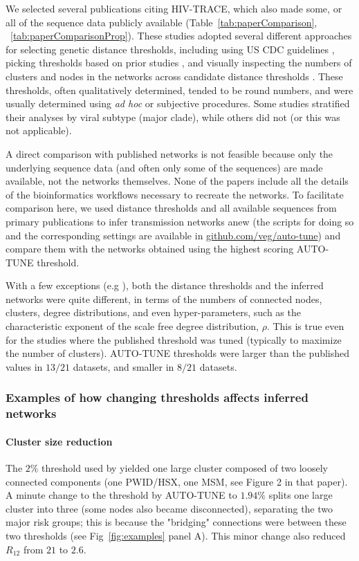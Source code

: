 \documentclass[utf8]{FrontiersinHarvard} %
\begin{document}
We selected several publications citing HIV-TRACE, which also made some, or all
of the sequence data publicly available (Table~\ref{tab:paperComparison},
~\ref{tab:paperComparisonProp}). These studies adopted several different
approaches for selecting genetic distance thresholds, including using US CDC
guidelines \citep{yan_central_2020}, picking thresholds based on prior studies
\citep{sivay_hiv-1_2018}, and visually inspecting the numbers of clusters and
nodes in the networks across candidate distance thresholds
\citep{liu_dynamics_2020}. These thresholds, often qualitatively determined,
tended to be round numbers, and were usually determined using {\it ad hoc} or
subjective procedures. Some studies stratified their analyses by viral subtype
(major clade), while others did not (or this was not applicable).

A direct comparison with published networks is not feasible because only the
underlying sequence data (and often only some of the sequences) are made
available, not the networks themselves. None of the papers include all the
details of the bioinformatics workflows necessary to recreate the networks. To
facilitate comparison here, we used distance thresholds and all available
sequences from primary publications to infer transmission networks anew (the
scripts for doing so and the corresponding settings are available in
\url{github.com/veg/auto-tune}) and compare them with the networks obtained
using the highest scoring AUTO-TUNE threshold.

With a few exceptions (e.g \cite{dalai_combining_2018,sivay_hiv-1_2018}), both
the distance thresholds and the inferred networks were quite different, in
terms of the numbers of connected nodes, clusters, degree distributions, and
even hyper-parameters, such as the characteristic exponent of the scale free
degree distribution, $\rho$. This is true even for the studies where the
published threshold was tuned (typically to maximize the number of clusters).
AUTO-TUNE thresholds were larger than the published values in $13/21$ datasets,
and smaller in $8/21$ datasets.

\subsubsection{Examples of how changing thresholds affects inferred networks}

\paragraph{Cluster size reduction} The $2\%$ threshold used by \citet{dalai_combining_2018} yielded one large
cluster composed of two loosely connected components (one PWID/HSX, one MSM,
see Figure 2 in that paper). A minute change to the threshold by AUTO-TUNE to
$1.94\%$ splits one large cluster into three (some nodes also became
disconnected), separating the two major risk groups; this is because the
"bridging" connections were between these two thresholds (see
Fig~\ref{fig:examples} panel A). This minor change also reduced $R_{12}$
from $21$ to $2.6$.
\end{document}
